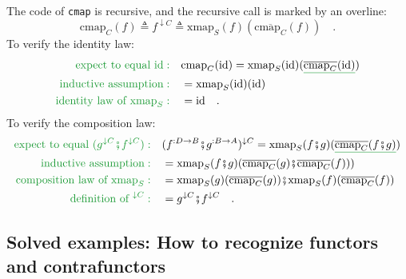 The code of \lstinline!cmap! is recursive, and the recursive call
is marked by an overline: 
\[
\text{cmap}_{C}(f)\triangleq f^{\downarrow C}\triangleq\text{xmap}_{S}(f)(\overline{\text{cmap}_{C}}(f))\quad.
\]
To verify the identity law:
\begin{align*}
{\color{greenunder}\text{expect to equal }\text{id}:}\quad & \text{cmap}_{C}(\text{id})=\text{xmap}_{S}(\text{id})(\gunderline{\overline{\text{cmap}_{C}}(\text{id})})\\
{\color{greenunder}\text{inductive assumption}:}\quad & =\text{xmap}_{S}(\text{id})(\text{id})\\
{\color{greenunder}\text{identity law of }\text{xmap}_{S}:}\quad & =\text{id}\quad.
\end{align*}
To verify the composition law:
\begin{align*}
{\color{greenunder}\text{expect to equal }(g^{\downarrow C}\bef f^{\downarrow C}):}\quad & (f^{:D\rightarrow B}\bef g^{:B\rightarrow A})^{\downarrow C}=\text{xmap}_{S}(f\bef g)(\gunderline{\overline{\text{cmap}_{C}}(f\bef g)})\\
{\color{greenunder}\text{inductive assumption}:}\quad & =\text{xmap}_{S}(f\bef g)(\overline{\text{cmap}_{C}}(g)\bef\overline{\text{cmap}_{C}}(f)))\\
{\color{greenunder}\text{composition law of }\text{xmap}_{S}:}\quad & =\text{xmap}_{S}(g)(\overline{\text{cmap}_{C}}(g))\bef\text{xmap}_{S}(f)(\overline{\text{cmap}_{C}}(f))\\
{\color{greenunder}\text{definition of }^{\downarrow C}:}\quad & =g^{\downarrow C}\bef f^{\downarrow C}\quad.
\end{align*}


\subsection{Solved examples: How to recognize functors and contrafunctors\label{subsec:Solved-examples:-How-to-recognize-functors}}

